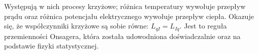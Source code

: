 \documentclass[10pt, a4paper, twoside, onecolumn]{article}
\numberwithin{equation}{section}
\begin{document}
	Występują w nich procesy krzyżowe; różnica temperatury wywołuje przepływ prądu oraz różnica potencjału elektrycznego wywołuje przepływ ciepła.
	Okazuje się, że współczynniki krzyżowe są sobie równe: \(L_{qI}=L_{Iq}\). Jest to reguła przemienności Onsagera, która została udowodniona doświadczalnie oraz na podstawie fizyki statystycznej. \par
	
	
\end{document}
